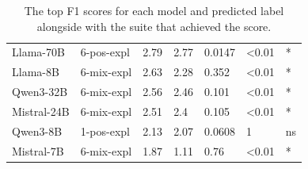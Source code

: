 \begin{table}
\begin{tabular}{ll|lllll}
    \midrule
    Llama-70B & 6-pos-expl & 2.79 & 2.77 & 0.0147 & <0.01 & * \\
    Llama-8B & 6-mix-expl & 2.63 & 2.28 & 0.352 & <0.01 & * \\
    Qwen3-32B & 6-mix-expl & 2.56 & 2.46 & 0.101 & <0.01 & * \\
    Mistral-24B & 6-mix-expl & 2.51 & 2.4 & 0.105 & <0.01 & * \\
    Qwen3-8B & 1-pos-expl & 2.13 & 2.07 & 0.0608 & 1 & ns \\
    Mistral-7B & 6-mix-expl & 1.87 & 1.11 & 0.76 & <0.01 & * \\
    \bottomrule
    \end{tabular}


    \caption{The top F1 scores for each model and predicted label alongside with the suite that achieved the score.}
    \label{tab:best_with_mcnemar}
\end{table}